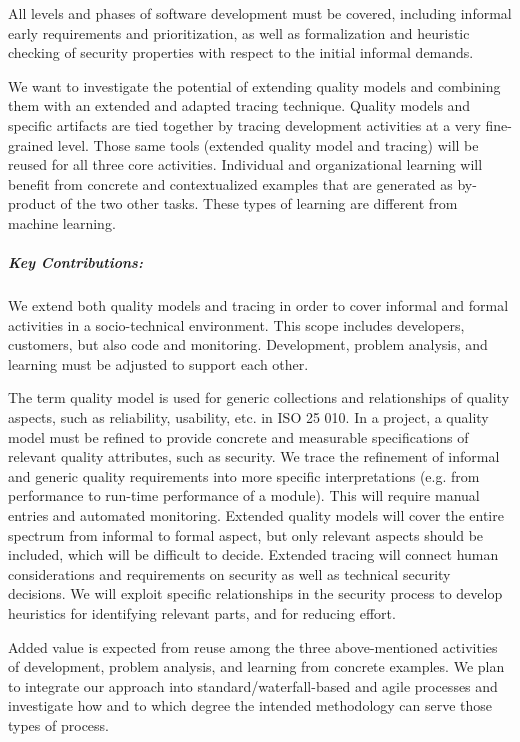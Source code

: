 All levels and phases of software development must be covered, including informal early requirements and prioritization, as well as formalization and heuristic checking of security properties with respect to the initial informal demands. 

We want to investigate the potential of extending quality models and combining them with an exten­ded and adapted tracing technique. Quality models and specific artifacts are tied together by tracing development activities at a very fine-grained level. Those same tools (extended quality model and tracing) will be reused for all three core activities. Individual and organizational learning will benefit from concrete and contextualized examples that are generated as by-product of the two other tasks. These types of learning are different from machine learning.

\subparagraph*{Key Contributions:}
We extend both quality models and tracing in order to cover informal and formal activities in a socio-technical environment. This scope includes developers, customers, but also code and monitoring. Development, problem analysis, and learning must be adjusted to support each other.

The term quality model is used for generic collections and relationships of quality aspects, such as reliability, usability, etc. in ISO 25 010. In a project, a quality model must be refined to provide concrete and measurable specifications of relevant quality attributes, such as security. We trace the refinement of informal and generic quality requirements into more specific interpretations (e.g. from performance to run-time performance of a module). This will require manual entries and automated monitoring. Extended quality models will cover the entire spectrum from informal to formal aspect, but only relevant aspects should be included, which will be difficult to decide. Extended tracing will connect human considerations and requirements on security as well as technical security decisions. We will exploit specific relationships in the security process to develop heuristics for identifying relevant parts, and for reducing effort. 

Added value is expected from reuse among the three above-mentioned activities of development, problem analysis, and learning from concrete examples. We plan to integrate our approach into standard/waterfall-based and agile processes and investigate how and to which degree the intended methodology can serve those types of process.


